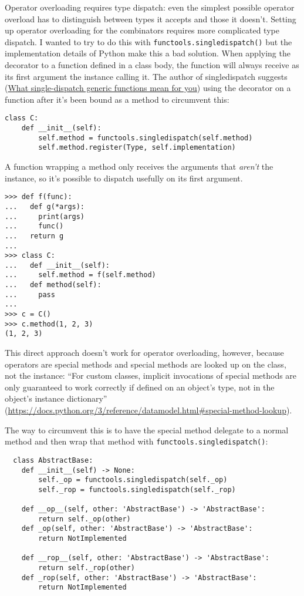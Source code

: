 \documentclass[12pt]{article}
\begin{document}
Operator overloading requires type dispatch: even the simplest
possible operator overload has to distinguish between types it accepts
and those it doesn't.  Setting up operator overloading for the
combinators requires more complicated type dispatch.  I wanted to try
to do this with \texttt{functools.singledispatch()} but the
implementation details of Python make this a bad solution.  When
applying the decorator to a function defined in a class body, the
function will always receive as its first argument the instance
calling it.  The author of singledispatch suggests
(\href{http://lukasz.langa.pl/8/single-dispatch-generic-functions/}{What
  single-dispatch generic functions mean for you}) using the decorator
on a function after it's been bound as a method to circumvent this:

\begin{lstlisting}
class C:
    def __init__(self):
        self.method = functools.singledispatch(self.method)
        self.method.register(Type, self.implementation)
\end{lstlisting}

A function wrapping a method only receives the arguments that
\emph{aren't} the instance, so it's possible to dispatch usefully on
its first argument.

\begin{lstlisting}
>>> def f(func):
...   def g(*args):
...     print(args)
...     func()
...   return g
... 
>>> class C:
...   def __init__(self):
...     self.method = f(self.method)
...   def method(self):
...     pass
... 
>>> c = C()
>>> c.method(1, 2, 3)
(1, 2, 3)
\end{lstlisting}

This direct approach doesn't work for operator overloading, however,
because operators are special methods and special methods are looked
up on the class, not the instance: ``For custom classes, implicit
invocations of special methods are only guaranteed to work correctly
if defined on an object's type, not in the object's instance
dictionary''
(\url{https://docs.python.org/3/reference/datamodel.html#special-method-lookup}).

The way to circumvent this is to have the special method delegate to a
normal method and then wrap that method with
\texttt{functools.singledispatch()}:

\begin{lstlisting}
  class AbstractBase:
    def __init__(self) -> None:
        self._op = functools.singledispatch(self._op)
        self._rop = functools.singledispatch(self._rop)

    def __op__(self, other: 'AbstractBase') -> 'AbstractBase':
        return self._op(other)
    def _op(self, other: 'AbstractBase') -> 'AbstractBase':
        return NotImplemented

    def __rop__(self, other: 'AbstractBase') -> 'AbstractBase':
        return self._rop(other)
    def _rop(self, other: 'AbstractBase') -> 'AbstractBase':
        return NotImplemented
\end{lstlisting}
\end{document}
